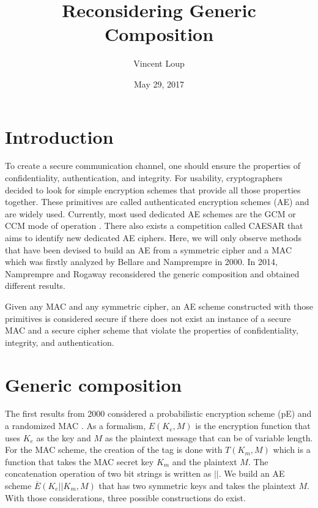 \documentclass[10pt,a4paper]{article}
\title{\vspace{-25mm}Reconsidering Generic Composition}
\author{Vincent Loup}
\date{May 29, 2017}
\begin{document}
\maketitle

\section{Introduction}
To create a secure communication channel, one should ensure the properties of confidentiality, authentication, and integrity.
For usability, cryptographers decided to look for simple encryption schemes that provide all those properties together.
These primitives are called authenticated encryption schemes (AE) and are widely used.
Currently, most used dedicated AE schemes are the GCM or CCM mode of operation \cite{dworkin2007sp}\cite{whiting2003counter}.
There also exists a competition called CAESAR that aims to identify new dedicated AE ciphers.
Here, we will only observe methods that have been devised to build an AE from a symmetric cipher and a MAC which was firstly analyzed by Bellare and Namprempre in 2000.
In 2014, Namprempre and Rogaway reconsidered the generic composition and obtained different results.

Given any MAC and any symmetric cipher, an AE scheme constructed with those primitives is considered secure if there does not exist an instance of a secure MAC and a secure cipher scheme that violate the properties of confidentiality, integrity, and authentication.

\section{Generic composition}
The first results from 2000 considered a probabilistic encryption scheme (pE) and a randomized MAC \cite{bellare2000authenticated}.
As a formalism, $E(K_e, M)$ is the encryption function that uses $K_e$ as the key and $M$ as the plaintext message that can be of variable length.
For the MAC scheme, the creation of the tag is done with $T(K_m, M)$ which is a function that takes the MAC secret key $K_m$ and the plaintext $M$.
The concatenation operation of two bit strings is written as $||$.
We build an AE scheme $\overline{E}(K_e||K_m, M)$ that has two symmetric keys and takes the plaintext $M$.
With those considerations, three possible constructions do exist.
\end{document}
